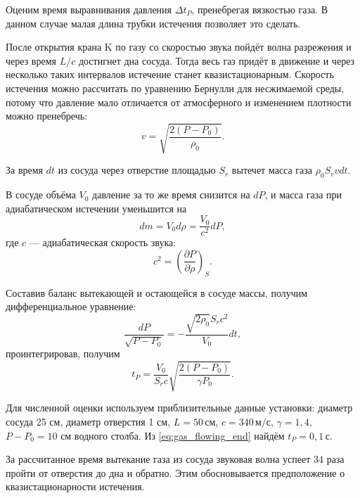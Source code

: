 \documentclass[12pt]{article}
\begin{document}
	 Оценим время выравнивания давления $\Delta t_P$, пренебрегая вязкостью газа. В данном случае малая длина трубки истечения позволяет это сделать.
	
	После открытия крана K по газу со скоростью звука пойдёт волна разрежения и через время $L/c$ достигнет дна сосуда. Тогда весь газ придёт в движение и через несколько таких интервалов истечение станет квазистационарным. Скорость истечения можно рассчитать по уравнению Бернулли для несжимаемой среды, потому что давление мало отличается от атмосферного и изменением плотности можно пренебречь:
	\begin{equation}
	\label{eq:velocity_bernoully}
	v=\sqrt{\frac{2 \left( P-P_0 \right)}{\rho_0}}.
	\end{equation}
	
	За время $dt$ из сосуда через отверстие площадью $S_r$ вытечет масса газа $\rho_0 S_r v dt$.
	
	В сосуде объёма $V_0$ давление за то же время снизится на $dP$, и масса газа при адиабатическом истечении уменьшится на
	\begin{equation}
	\label{eq:dmass_adiabate}
	dm=V_0 d\rho=\frac{V_0}{c^2} dP,
	\end{equation}
	где $c$ --- адиабатическая скорость звука:
	\begin{equation}
	\label{eq:velocity_sound_adiabate}
	c^2=\left( \frac{\partial P}{\partial \rho} \right)_S.
	\end{equation}
	
	Составив баланс вытекающей и остающейся в сосуде массы, получим дифференциальное уравнение:
	\begin{equation}
	\label{eq:gas_flowing_diff}
	\frac{dP}{\sqrt{P-P_0}}=-\frac{\sqrt{2\rho_0} S_r c^2}{V_0}dt,
	\end{equation}
	проинтегрировав, получим
	\begin{equation}
	\label{eq:gas_flowing_end}
	t_P=\frac{V_0}{S_r c}\sqrt{\frac{2 \left( P-P_0 \right)}{\gamma P_0}}.
	\end{equation}
	
	Для численной оценки используем приблизительные данные установки: диаметр сосуда 25 см, диаметр отверстия 1 см, $L = 50\,\text{см}$, $c = 340\,\text{м}/\text{с}$, $\gamma=1{,}4$, $P-P_0=10$ см водного столба. Из \eqref{eq:gas_flowing_end} найдём $t_P=0{,}1\,\text{с}$.
	
	За рассчитанное время вытекание газа из сосуда звуковая волна успеет 34 раза пройти от отверстия до дна и обратно. Этим обосновывается предположение о квазистационарности истечения.
	
\end{document}
